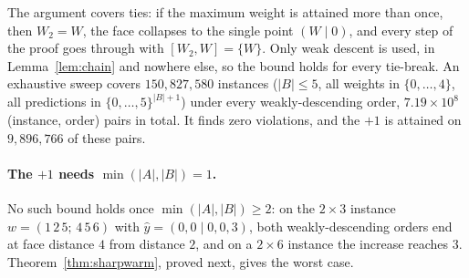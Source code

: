 The argument covers ties: if the maximum weight is attained more than once, then $W_2 = W$, the
face collapses to the single point $(W \mid 0)$, and every step of the proof goes through with
$[W_2, W] = \{W\}$. Only weak descent is used, in Lemma~\ref{lem:chain} and nowhere else, so the
bound holds for every tie-break. An exhaustive sweep covers $150{,}827{,}580$ instances
($|B| \le 5$, all weights in $\{0,\dots,4\}$, all predictions in $\{0,\dots,5\}^{|B|+1}$) under
every weakly-descending order, $7.19\times10^{8}$ (instance, order) pairs in total. It finds zero
violations, and the $+1$ is attained on $9{,}896{,}766$ of these pairs.

\paragraph{The $+1$ needs $\min(|A|,|B|) = 1$.} No such bound holds once $\min(|A|,|B|) \ge 2$: on
the $2\times3$ instance $w = (1\,2\,5;\,4\,5\,6)$ with $\hat y = (0,0 \mid 0,0,3)$, both weakly-descending
orders end at face distance $4$ from distance $2$, and on a $2\times6$ instance the increase reaches $3$.
Theorem~\ref{thm:sharpwarm}, proved next, gives the worst case.

